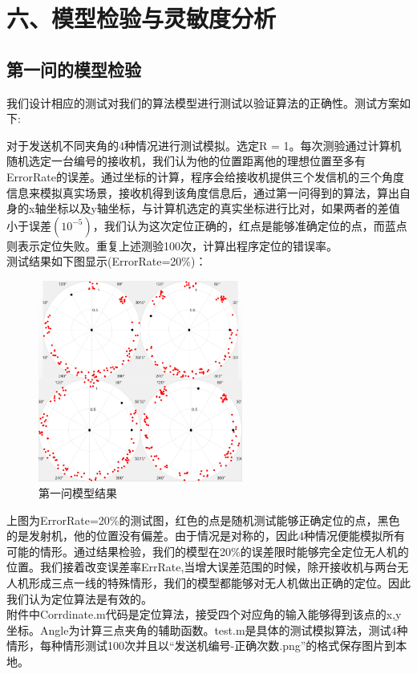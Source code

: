 \documentclass{my_paper}
\begin{document}
\section{六、模型检验与灵敏度分析}
\subsection{第一问的模型检验}
我们设计相应的测试对我们的算法模型进行测试以验证算法的正确性。测试方案如下:

对于发送机不同夹角的4种情况进行测试模拟。选定R = 1。每次测验通过计算机随机选定一台编号的接收机，我们认为他的位置距离他的理想位置至多有ErrorRate的误差。通过坐标的计算，程序会给接收机提供三个发信机的三个角度信息来模拟真实场景，接收机得到该角度信息后，通过第一问得到的算法，算出自身的x轴坐标以及y轴坐标，与计算机选定的真实坐标进行比对，如果两者的差值小于误差$(10^{-5})$，我们认为这次定位正确的，红点是能够准确定位的点，而蓝点则表示定位失败。重复上述测验100次，计算出程序定位的错误率。\\
测试结果如下图显示(ErrorRate=20\%)：
\begin{figure}[H]
    \centering
    \includegraphics[width=0.6\textwidth]{check1}
    \caption{第一问模型结果} 
\end{figure}

上图为ErrorRate=20\%的测试图，红色的点是随机测试能够正确定位的点，黑色的是发射机，他的位置没有偏差。由于情况是对称的，因此4种情况便能模拟所有可能的情形。通过结果检验，我们的模型在20\%的误差限时能够完全定位无人机的位置。我们接着改变误差率ErrRate,当增大误差范围的时候，除开接收机与两台无人机形成三点一线的特殊情形，我们的模型都能够对无人机做出正确的定位。因此我们认为定位算法是有效的。\\
附件中Corrdinate.m代码是定位算法，接受四个对应角的输入能够得到该点的x,y坐标。Angle为计算三点夹角的辅助函数。test.m是具体的测试模拟算法，测试4种情形，每种情形测试100次并且以“发送机编号-正确次数.png”的格式保存图片到本地。
\end{document}

